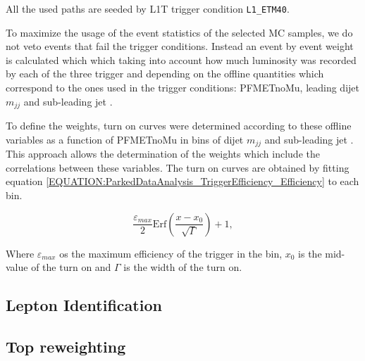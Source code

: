 All the used paths are seeded by \gls{L1T} trigger condition \verb!L1_ETM40!. 

To maximize the usage of the event statistics of the selected \gls{MC} samples, we do not veto events that fail the trigger conditions. Instead an event by event weight is calculated which which taking into account how much luminosity was recorded by each of the three trigger and depending on the offline quantities which correspond to the ones used in the trigger conditions: PFMETnoMu, leading dijet $m_{jj}$ and sub-leading jet \pt. 

To define the weights, turn on curves were determined according to these offline variables as a function of PFMETnoMu in bins of dijet $m_{jj}$ and sub-leading jet \pt. This approach allows the determination of the weights which include the correlations between these variables. The turn on curves are obtained by fitting equation \ref{EQUATION:ParkedDataAnalysis_TriggerEfficiency_Efficiency} to each bin.

\begin{equation}
\frac{\varepsilon_{max}}{2}\text{Erf}\left(\frac{x-x_{0}}{\sqrt{\Gamma}}\right)+1,
\label{EQUATION:ParkedDataAnalysis_TriggerEfficiency_Efficiency} 
\end{equation}

Where $\varepsilon_{max}$ os the maximum efficiency of the trigger in the bin, $x_{0}$ is the mid-value of the turn on and $\Gamma$ is the width of the turn on.

\subsection{Lepton Identification}


\subsection{Top reweighting}


